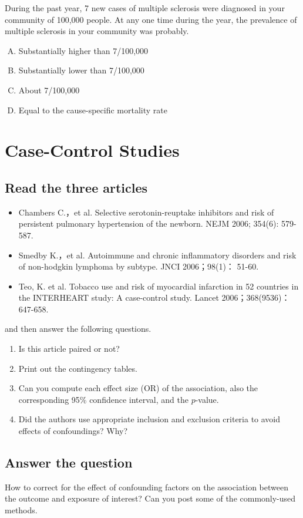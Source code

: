 \documentclass[11pt,a4paper]{article}
\begin{document}
\begin{CJK*}{UTF8}{gbsn}
During the past year, 7 new cases of multiple sclerosis were diagnosed in your 
community of 100,000 people. At any one time during the year, the prevalence of 
multiple sclerosis in your community was probably.
\begin{enumerate}[(A)]
  \item Substantially higher than 7/100,000
  \item Substantially lower than 7/100,000
  \item About 7/100,000
  \item Equal to the cause-specific mortality rate
\end{enumerate}

\section{Case-Control Studies}
\subsection{Read the three articles}
\begin{itemize}
	\item Chambers C.，et al. Selective serotonin-reuptake inhibitors and risk of persistent 
pulmonary hypertension of the newborn. NEJM 2006; 354(6): 579-587.
	\item Smedby K.，et al. Autoimmune and chronic inflammatory disorders and risk of 
non-hodgkin lymphoma by subtype. JNCI 2006；98(1)： 51-60.
	\item Teo, K. et al. Tobacco use and risk of myocardial infarction in 52 countries 
in the INTERHEART study: A case-control study. Lancet 2006；368(9536)： 647-658.
\end{itemize}
and then answer the following questions.
\begin{enumerate}[(1)]
	\item Is this article paired or not?
	\item Print out the contingency tables.
	\item Can you compute each effect size (OR) of the association, also the corresponding 
		95\% confidence interval, and the $p$-value.
	\item Did the authors use appropriate inclusion and exclusion criteria to avoid effects 
		of confoundings? Why?
\end{enumerate}

\subsection{Answer the question}
How to correct for the effect of confounding factors on the association between the 
outcome and exposure of interest? Can you post some of the commonly-used methods.



\end{CJK*}
\end{document}
